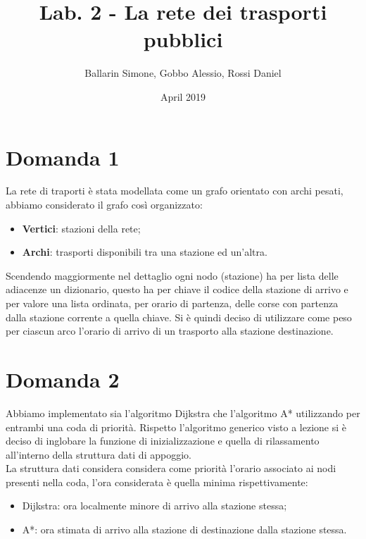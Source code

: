 \documentclass{article}
\title{Lab. 2 - La rete dei trasporti pubblici}
\author{Ballarin Simone, Gobbo Alessio, Rossi Daniel}
\date{April 2019}
\begin{document}
\maketitle

\section*{Domanda 1}
La rete di traporti è stata modellata come un grafo orientato con archi pesati, abbiamo considerato il grafo così organizzato:
\begin{itemize}
	\item \textbf{Vertici}: stazioni della rete;
	\item \textbf{Archi}: trasporti disponibili tra una stazione ed un'altra.
\end{itemize}

Scendendo maggiormente nel dettaglio ogni nodo (stazione) ha per lista delle adiacenze un dizionario, questo ha per chiave il codice della stazione di arrivo e per valore una lista ordinata, per orario di partenza, delle corse con partenza dalla stazione corrente a quella chiave.
Si è quindi deciso di utilizzare come peso per ciascun arco l'orario di arrivo di un trasporto alla stazione destinazione.

\section*{Domanda 2}
Abbiamo implementato sia l'algoritmo Dijkstra che l'algoritmo A* utilizzando per entrambi una coda di priorità.
Rispetto l'algoritmo generico visto a lezione si è deciso di inglobare la funzione di inizializzazione e quella di rilassamento all'interno della struttura dati di appoggio.\\
La struttura dati considera considera come priorità l'orario associato ai nodi presenti nella coda, l'ora considerata è quella minima rispettivamente:
\begin{itemize}
	\item Dijkstra: ora localmente minore di arrivo alla stazione stessa;
	\item A*: ora stimata di arrivo alla stazione di destinazione dalla stazione stessa.
\end{itemize}

\newpage
\end{document}

